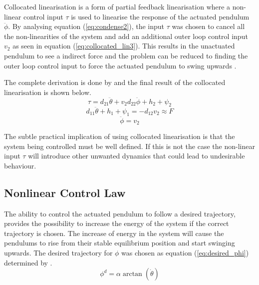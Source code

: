 Collocated linearisation is a form of partial feedback linearisation where a non-linear control input $\tau$ is used to linearise the response of the actuated pendulum $\ddot{\phi}$. By analysing equation (\ref{eq:condense2}), the input $\tau$ was chosen to cancel all the non-linearities of the system and add an additional outer loop control input $v_{2}$ as seen in equation (\ref{eq:collocated_lin3}). This results in the unactuated pendulum to see a indirect force and the problem can be reduced to finding the outer loop control input to force the actuated pendulum to swing upwards \citep{spong_swingup}.

 The complete derivation is done by \citeauthor{spong_swingup} and the final result of the collocated linearisation is shown below.
\begin{equation} \label{eq:collocated_lin3}
\tau = d_{21}\ddot{\theta} + v_{2}d_{22}\ddot{\phi} + h_{2} + \psi_{2}
\end{equation}
\begin{equation} \label{eq:collocated_lin1}
d_{11}\ddot{\theta} + h_{1} + \psi_{1} = -d_{12}v_{2} \approx F
\end{equation}
\begin{equation} \label{eq:collocated_lin2}
\ddot{\phi} = v_{2}
\end{equation}

The subtle practical implication of using collocated linearisation is that the system being controlled must be well defined. If this is not the case the non-linear input $\tau$ will introduce other unwanted dynamics that could lead to undesirable behaviour.

\subsection{Nonlinear Control Law}
\label{sec:nonlinear_control_law}

The ability to control the actuated pendulum to follow a desired trajectory, provides the possibility to increase the energy of the system if the correct trajectory is chosen. The increase of energy in the system will cause the pendulums to rise from their stable equilibrium position and start swinging upwards. The desired trajectory for ${\phi}$ was chosen as equation (\ref{eq:desired_phi}) determined by \citet{spong_swingup}.
\begin{equation} \label{eq:desired_phi}
\phi^{d} =  \alpha \arctan(\dot{\theta})
\end{equation}

